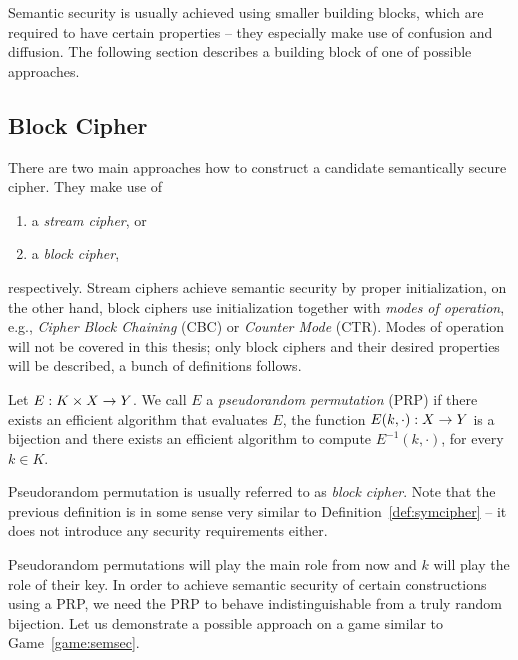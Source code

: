 	Semantic security is usually achieved using smaller building blocks, which are required to have certain properties -- they especially make use of confusion and diffusion. The following section describes a building block of one of possible approaches.



\subsection{Block Cipher}

There are two main approaches how to construct a candidate semantically secure cipher. They make use of
\begin{enumerate}
	\item a {\em stream cipher}, or
	\item a {\em block cipher},
\end{enumerate}
respectively. Stream ciphers achieve semantic security by proper initialization, on the other hand, block ciphers use initialization together with {\em modes of operation}, e.g., {\em Cipher Block Chaining} (CBC) or {\em Counter Mode} (CTR). Modes of operation will not be covered in this thesis; only block ciphers and their desired properties will be described, a bunch of definitions follows.

\begin{defn}
\label{def:prp}
	Let $E: K\times X\rightarrow Y$. We call $E$ a {\em pseudorandom permutation} (PRP) if there exists an efficient algorithm that evaluates $E$, the function $E(k,\cdot): X\rightarrow Y$ is a bijection and there exists an efficient algorithm to compute $E^{-1}(k,\cdot)$, for every $k\in K$.
\end{defn}

\begin{note}
	Pseudorandom permutation is usually referred to as {\em block cipher}. Note that the previous definition is in some sense very similar to Definition~\ref{def:symcipher} -- it does not introduce any security requirements either.
\end{note}

Pseudorandom permutations will play the main role from now and $k$ will play the role of their key. In order to achieve semantic security of certain constructions using a PRP, we need the PRP to behave indistinguishable from a truly random bijection. Let us demonstrate a possible approach on a game similar to Game~\ref{game:semsec}.


